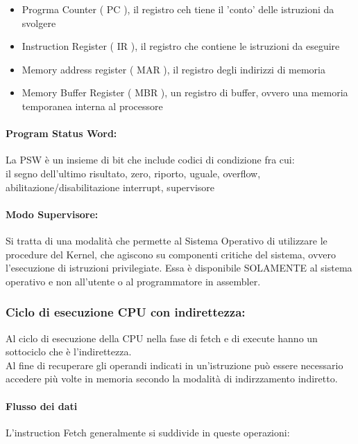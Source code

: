\documentclass[arch.tex]{subfiles}
\begin{document}
\begin{itemize}
	\item Progrma Counter ( PC ), il registro ceh tiene il 'conto' delle istruzioni da svolgere
	\item Instruction Register ( IR ), il registro che contiene le istruzioni da eseguire
	\item Memory address register ( MAR ), il registro degli indirizzi di memoria
	\item Memory Buffer Register ( MBR ), un registro di buffer, ovvero una memoria temporanea interna al
		processore
\end{itemize}

\paragraph{Program Status Word:}
La PSW è un insieme di bit che include codici di condizione fra cui:\\
il segno dell'ultimo risultato, zero, riporto, uguale, overflow, abilitazione/disabilitazione interrupt, supervisore

\paragraph{Modo Supervisore:}
Si tratta di una modalità che permette al Sistema Operativo di utilizzare le procedure del Kernel, che agiscono su componenti
critiche del sistema, ovvero l'esecuzione di istruzioni privilegiate. Essa è disponibile SOLAMENTE al sistema operativo e non 
all'utente o al programmatore in assembler.

\subsubsection{Ciclo di esecuzione CPU con indirettezza:}
Al ciclo di esecuzione della CPU nella fase di fetch e di execute hanno un sottociclo che è l'indirettezza.\\
Al fine di recuperare gli operandi indicati in un'istruzione può essere necessario accedere più volte in memoria
secondo la modalità di indirzzamento indiretto.

\paragraph{Flusso dei dati}%
\label{par:flusso_dei_dati}
L'instruction Fetch generalmente si suddivide in queste operazioni:
\end{document}
